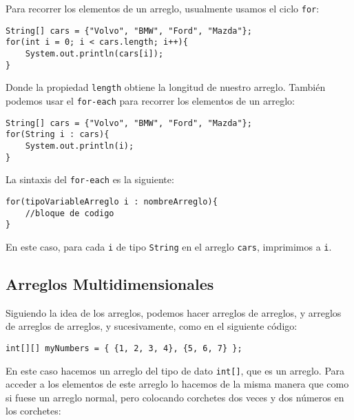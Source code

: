 \documentclass[12pt]{article}
\newcounter{it}
\theoremstyle{largebreak}
\begin{document}
    Para recorrer los elementos de un arreglo, usualmente usamos el ciclo \lstinline|for|:

    \begin{lstlisting}[caption={Recorrer arreglo.},label=DescriptiveLabel]
String[] cars = {"Volvo", "BMW", "Ford", "Mazda"};
for(int i = 0; i < cars.length; i++){
    System.out.println(cars[i]);
}
    \end{lstlisting}

    Donde la propiedad \lstinline|length| obtiene la longitud de nuestro arreglo. También podemos usar el \lstinline|for-each| para recorrer los elementos de un arreglo:

    \begin{lstlisting}[caption={Recorrer arreglo con \lstinline|for-each|.},label=DescriptiveLabel]
String[] cars = {"Volvo", "BMW", "Ford", "Mazda"};
for(String i : cars){
    System.out.println(i);
}       
    \end{lstlisting}
    
    La sintaxis del \lstinline|for-each| es la siguiente: 

    \begin{lstlisting}[caption={Sintaxis \lstinline|for-each|.},label=DescriptiveLabel]
for(tipoVariableArreglo i : nombreArreglo){
    //bloque de codigo
}       
    \end{lstlisting}

    En este caso, para cada \lstinline|i| de tipo \lstinline|String| en el arreglo \lstinline|cars|, imprimimos a \lstinline|i|.

    \subsection{Arreglos Multidimensionales}

    Siguiendo la idea de los arreglos, podemos hacer arreglos de arreglos, y arreglos de arreglos de arreglos, y sucesivamente, como en el siguiente código:

    \begin{lstlisting}[caption={Arreglo Bidimensional.},label=DescriptiveLabel]
int[][] myNumbers = { {1, 2, 3, 4}, {5, 6, 7} };
    \end{lstlisting}

    En este caso hacemos un arreglo del tipo de dato \lstinline|int[]|, que es un arreglo. Para acceder a los elementos de este arreglo lo hacemos de la misma manera que como si fuese un arreglo normal, pero colocando corchetes dos veces y dos números en los corchetes:
\end{document}
